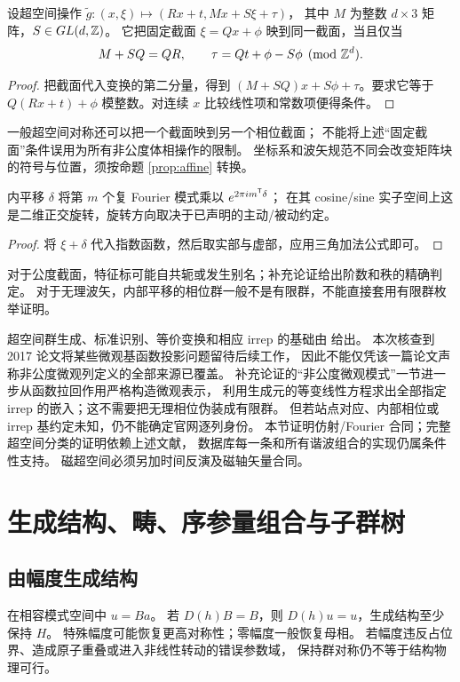 \begin{proposition}[截面的仿射相容性]
设超空间操作
$\widetilde g:(x,\xi)\mapsto(Rx+t,Mx+S\xi+\tau)$，
其中 $M$ 为整数 $d\times3$ 矩阵，$S\in GL(d,\mathbb Z)$。
它把固定截面 $\xi=Qx+\phi$ 映到同一截面，当且仅当
\[
 M+SQ=QR,\qquad \tau=Qt+\phi-S\phi\pmod{\mathbb Z^d}.
\]
\end{proposition}
\begin{proof}
把截面代入变换的第二分量，得到
$(M+SQ)x+S\phi+\tau$。要求它等于
$Q(Rx+t)+\phi$ 模整数。对连续 $x$ 比较线性项和常数项便得条件。
\end{proof}
一般超空间对称还可以把一个截面映到另一个相位截面；
不能将上述“固定截面”条件误用为所有非公度体相操作的限制。
坐标系和波矢规范不同会改变矩阵块的符号与位置，须按命题
\ref{prop:affine} 转换。

\begin{proposition}[内部平移的谐波表示]
内平移 $\delta$ 将第 $m$ 个复 Fourier 模式乘以
$e^{2\pi i m^\mathsf T\delta}$；
在其 cosine/sine 实子空间上这是二维正交旋转，旋转方向取决于已声明的主动/被动约定。
\end{proposition}
\begin{proof}
将 $\xi+\delta$ 代入指数函数，然后取实部与虚部，应用三角加法公式即可。
\end{proof}
对于公度截面，特征标可能自共轭或发生别名；补充论证给出阶数和秩的精确判定。
对于无理波矢，内部平移的相位群一般不是有限群，不能直接套用有限群枚举证明。

超空间群生成、标准识别、等价变换和相应 irrep 的基础由
\citet{Stokes2007,Stokes2011,Stokes2013,Smaalen2013,Stokes2017} 给出。
本次核查到 2017 论文将某些微观基函数投影问题留待后续工作，
因此不能仅凭该一篇论文声称非公度微观列定义的全部来源已覆盖。
补充论证的“非公度微观模式”一节进一步从函数拉回作用严格构造微观表示，
利用生成元的等变线性方程求出全部指定 irrep 的嵌入；这不需要把无理相位伪装成有限群。
但若站点对应、内部相位或 irrep 基约定未知，仍不能确定官网逐列身份。
本节证明仿射/Fourier 合同；完整超空间分类的证明依赖上述文献，
数据库每一条和所有谐波组合的实现仍属条件性支持。
磁超空间必须另加时间反演及磁轴矢量合同\citep{Magnetic2012}。

\section{生成结构、畴、序参量组合与子群树}\label{sec:derived}
\subsection{由幅度生成结构}
在相容模式空间中 $u=B a$。
若 $D(h)B=B$，则 $D(h)u=u$，生成结构至少保持 $H$。
特殊幅度可能恢复更高对称性；零幅度一般恢复母相。
若幅度违反占位界、造成原子重叠或进入非线性转动的错误参数域，
保持群对称仍不等于结构物理可行。

